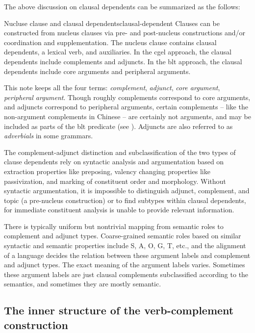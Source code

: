 \documentclass{article}
\newcommand*{\term}[1]{\emph{#1}}
\begin{document}
The above discussion on clausal dependents can be summarized as the follows:
\begin{infobox}{Nucluse clause and clausal dependents}{clausal-dependent}
    Clauses can be constructed from nucleus clauses via pre- and post-nucleus constructions 
    and/or coordination and supplementation.
    The nucleus clause contains clausal dependents, a lexical verb, and auxiliaries.
    In the \ac{cgel} approach, the clausal dependents include complements and adjuncts.
    In the \ac{blt} approach, the clausal dependents include core arguments and peripheral arguments.

    This note keeps all the four terms: \term{complement}, \term{adjunct}, 
    \term{core argument}, \term{peripheral argument}.
    Though roughly complements correspond to core arguments,
    and adjuncts correspond to peripheral arguments,
    certain complements -- like the non-argument complements in Chinese -- 
    are certainly not arguments, and may be included as parts of the \ac{blt} predicate 
    (see ).
    Adjuncts are also referred to as \term{adverbials} in some grammars.

    The complement-adjunct distinction and subclassification of the two types of clause dependents 
    rely on syntactic analysis and argumentation 
    based on extraction properties like preposing,
    valency changing properties like passivization,
    and marking of constituent order and morphology.
    Without syntactic argumentation, 
    it is impossible to distinguish adjunct, complement, and topic (a pre-nucleus construction) 
    or to find subtypes within clausal dependents,
    for immediate constituent analysis is unable to provide relevant information.
    
    There is typically uniform but nontrivial mapping from semantic roles to complement and adjunct types.
    Coarse-grained semantic roles based on similar syntactic and semantic properties 
    include S, A, O, G, T, etc.,
    and the alignment of a language decides 
    the relation between these argument labels
    and complement and adjunct types.
    The exact meaning of the argument labels varies.
    Sometimes these argument labels are just clausal complements subclassified 
    according to the semantics,
    and sometimes they are mostly semantic.
\end{infobox}

\subsection{The inner structure of the verb-complement construction}
\end{document}
